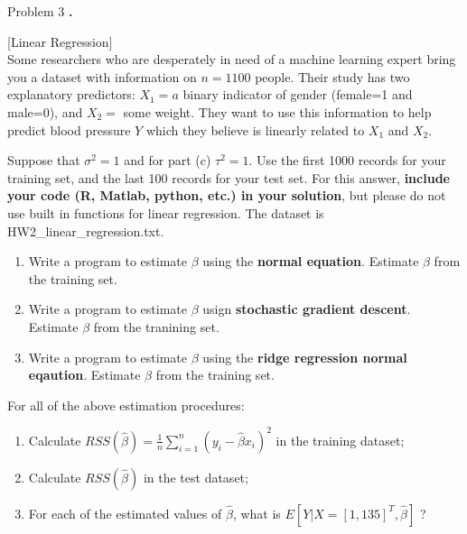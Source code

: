 \documentclass{article}
\newcounter{pcounter}                                   %
\newenvironment{problem}                                %
{                                                       %
    \color{gray}                                        %
    \stepcounter{pcounter}                              %
    \textbf{\arabic{pcounter}.}                         %
}{}                                                     %
\begin{document}
    \begin{section}{Problem 3}
        \setcounter{pcounter}{0}
        \begin{problem}
            [Linear Regression]\\
            Some researchers who are desperately in need of a machine learning expert bring you a dataset with information on $n = 1100$ people.
            Their study has two explanatory predictors: $X_1=a$ binary indicator of gender (female=1 and male=0), and $X_2=$ some weight.
            They want to use this information to help predict blood pressure $Y$ which they believe is linearly related to $X_1$ and $X_2$.
            
            Suppose that $\sigma^2 = 1$ and for part (c) $\tau^2=1$. Use the first 1000 records for your training set, and the last 100 records for your test set.
            For this answer, \textbf{include your code (R, Matlab, python, etc.) in your solution}, but please do not use built in functions for linear regression. The dataset is HW2\_linear\_regression.txt.
            \begin{enumerate}[label=(\alph*)]
                \item Write a program to estimate $\beta$ using the \textbf{normal equation}. Estimate $\beta$ from the training set.
                \item Write a program to estimate $\beta$ usign \textbf{stochastic gradient descent}. Estimate $\beta$ from the tranining set.
                \item Write a program to estimate $\beta$ using the \textbf{ridge regression normal eqaution}. Estimate $\beta$ from the training set.
            \end{enumerate}
            For all of the above estimation procedures:
            \begin{enumerate}[resume, label=(\alph*)]
                \item Calculate $RSS(\hat{\beta}) = \frac{1}{n} \sum_{i=1}^{n} (y_i - \hat{\beta} x_i)^2$ in the training dataset;
                \item Calculate $RSS(\hat{\beta})$ in the test dataset;
                \item For each of the estimated values of $\hat{\beta}$, what is $E[Y|X=[1,135]^T, \hat{\beta}]$ ?
            \end{enumerate}
        \end{problem}


\end{section}
\end{document}
